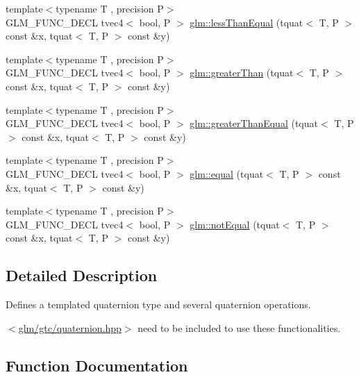 \begin{DoxyCompactItemize}
\item 
{\footnotesize template$<$typename T , precision P$>$ }\\G\+L\+M\+\_\+\+F\+U\+N\+C\+\_\+\+D\+E\+C\+L tvec4$<$ bool, P $>$ \hyperlink{group__gtc__quaternion_ga7c81996ed2724f26fe76faf352c76294}{glm\+::less\+Than\+Equal} (tquat$<$ T, P $>$ const \&x, tquat$<$ T, P $>$ const \&y)
\item 
{\footnotesize template$<$typename T , precision P$>$ }\\G\+L\+M\+\_\+\+F\+U\+N\+C\+\_\+\+D\+E\+C\+L tvec4$<$ bool, P $>$ \hyperlink{group__gtc__quaternion_ga09d21a588ae425ac7517ea65cc59a5ae}{glm\+::greater\+Than} (tquat$<$ T, P $>$ const \&x, tquat$<$ T, P $>$ const \&y)
\item 
{\footnotesize template$<$typename T , precision P$>$ }\\G\+L\+M\+\_\+\+F\+U\+N\+C\+\_\+\+D\+E\+C\+L tvec4$<$ bool, P $>$ \hyperlink{group__gtc__quaternion_ga0906a221a2037519fcf316ea5c1e3b3e}{glm\+::greater\+Than\+Equal} (tquat$<$ T, P $>$ const \&x, tquat$<$ T, P $>$ const \&y)
\item 
{\footnotesize template$<$typename T , precision P$>$ }\\G\+L\+M\+\_\+\+F\+U\+N\+C\+\_\+\+D\+E\+C\+L tvec4$<$ bool, P $>$ \hyperlink{group__gtc__quaternion_gac187115710365e0b2902220b9611e7b6}{glm\+::equal} (tquat$<$ T, P $>$ const \&x, tquat$<$ T, P $>$ const \&y)
\item 
{\footnotesize template$<$typename T , precision P$>$ }\\G\+L\+M\+\_\+\+F\+U\+N\+C\+\_\+\+D\+E\+C\+L tvec4$<$ bool, P $>$ \hyperlink{group__gtc__quaternion_ga484c4633f7c05d8e29ee8b452350f539}{glm\+::not\+Equal} (tquat$<$ T, P $>$ const \&x, tquat$<$ T, P $>$ const \&y)
\end{DoxyCompactItemize}


\subsection{Detailed Description}
Defines a templated quaternion type and several quaternion operations. 

$<$\hyperlink{gtc_2quaternion_8hpp}{glm/gtc/quaternion.\+hpp}$>$ need to be included to use these functionalities. 

\subsection{Function Documentation}
\hypertarget{group__gtc__quaternion_gad4a4448baedb198b2b1e7880d2544dc9}{}
